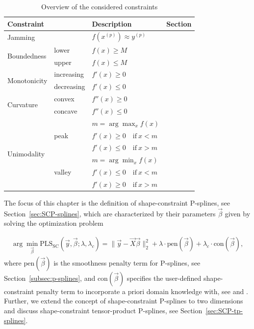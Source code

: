 \begin{table}[H]
	\centering
	\begin{tabular}{|l|ll|l|}
		\hline
		\textbf{Constraint}& & \textbf{Description}   & \textbf{Section}     \\ \hline \toprule
		Jamming            & & $f(x^{(p)}) \approx y^{(p)}$ & \pref{subsec:JammC} \\ \hline 
		\multirow{2}{*}{Boundedness}  & lower & $f(x)\ge M$ 	  &	\pref{subsec:BoudC} \\ \cline{2-4}
		& upper & $f(x)\le M$    & \pref{subsec:BoudC} \\ \hline
		\multirow{2}{*}{Monotonicity} & increasing & $f'(x) \ge 0$ 	& \pref{subsec:MIC} \\ \cline{2-4}
		& decreasing & $f'(x) \le 0$  & \pref{subsec:MDC} \\ \hline	
		\multirow{2}{*}{Curvature}    & convex     & $f''(x)\ge 0$ 	& \pref{subsec:ConvC} \\ \cline{2-4}
		& concave    & $f''(x)\le 0$ 	& \pref{subsec:ConcC} \\ \hline
		\multirow{6}{*}{Unimodality}  & \multirow[t]{3}{*}{peak}  & $m = \arg \max_{x} f(x)$  & \pref{subsec:PeakC} \\ 
		&	                       & $f'(x) \ge 0 \quad \text{if} \ x < m$ & \\ 
		&  				       & $f'(x) \le 0 \quad \text{if} \ x > m$ & \\ \cline{2-4} 
		& \multirow[t]{3}{*}{valley}& $m = \arg \min_{x} f(x)$  & \pref{subsec:ValleyC} \\ 
		&	                       & $f'(x) \le 0 \quad \text{if} \ x < m$ & \\ 
		&  				       & $f'(x) \ge 0 \quad \text{if} \ x > m$ &  \\ \hline		\bottomrule
	\end{tabular}
	\caption{Overview of the considered constraints}
	\label{tab:constraint_overview}
\end{table}
%
The focus of this chapter is the definition of shape-constraint P-splines, see Section~\ref{sec:SCP-splines}, which are characterized by their parameters $\vec{\beta}$ given by solving the optimization problem

\begin{align} \label{eq:OF-SCP-splines}
	\arg \min_{\vec{\beta}} \text{PLS}_{\text{SC}} (\vec{y}, \vec{\beta}; \lambda, \lambda_c) = \lVert \vec{y} - \vec{X} \vec{\beta} \rVert_2^2 + \lambda \cdot \text{pen}(\vec{\beta}) + \lambda_c \cdot \text{con}(\vec{\beta}),
\end{align}
%
where $\text{pen}(\vec{\beta})$ is the smoothness penalty term for P-splines, see Section~\ref{subsec:p-splines}, and $\text{con}(\vec{\beta})$ specifies the user-defined shape-constraint penalty term to incorporate a priori domain knowledge with, see \cite{hofner2011monotonicity} and \cite{bollaerts2006simple}. Further, we extend the concept of shape-constraint P-splines to two dimensions and discuss shape-constraint tensor-product P-splines, see Section~\ref{sec:SCP-tp-splines}.


